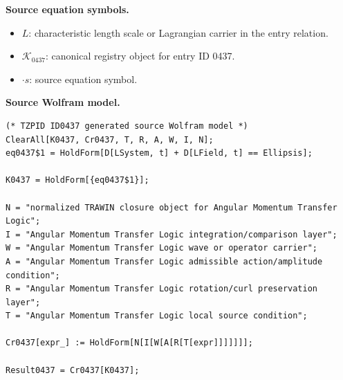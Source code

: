 \begin{minipage}[t]{0.49\linewidth}
\begingroup
\small
\raggedright
\textbf{Source equation symbols.}\par
\begin{itemize}[leftmargin=1.35em,itemsep=1pt,topsep=1pt,parsep=0pt]
    \item $L$: characteristic length scale or Lagrangian carrier in the entry relation.
    \item $\mathcal{K}_{0437}$: canonical registry object for entry ID 0437.
    \item $\cdot s$: source equation symbol.
\end{itemize}
\endgroup
\end{minipage}\hfill
\begin{minipage}[t]{0.47\linewidth}
\begingroup
\scriptsize
\raggedright
\textbf{Source Wolfram model.}\par
\begin{Verbatim}[fontsize=\tiny,breaklines=true,breakanywhere=true]
(* TZPID ID0437 generated source Wolfram model *)
ClearAll[K0437, Cr0437, T, R, A, W, I, N];
eq0437$1 = HoldForm[D[LSystem, t] + D[LField, t] == Ellipsis];

K0437 = HoldForm[{eq0437$1}];

N = "normalized TRAWIN closure object for Angular Momentum Transfer Logic";
I = "Angular Momentum Transfer Logic integration/comparison layer";
W = "Angular Momentum Transfer Logic wave or operator carrier";
A = "Angular Momentum Transfer Logic admissible action/amplitude condition";
R = "Angular Momentum Transfer Logic rotation/curl preservation layer";
T = "Angular Momentum Transfer Logic local source condition";

Cr0437[expr_] := HoldForm[N[I[W[A[R[T[expr]]]]]]];

Result0437 = Cr0437[K0437];
\end{Verbatim}
\endgroup
\end{minipage}

